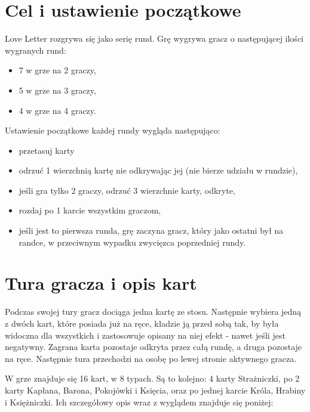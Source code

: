 \section*{Cel i ustawienie początkowe}
\label{sec:celIUstawieniePoczatkowe}
Love Letter rozgrywa się jako serię rund. Grę wygrywa gracz o następującej ilości wygranych rund:
\begin{itemize}
	\item 7 w grze na 2 graczy,
	\item 5 w grze na 3 graczy,
	\item 4 w grze na 4 graczy.
\end{itemize}

Ustawienie początkowe każdej rundy wygląda następująco:
\begin{itemize}
	\item przetasuj karty
	\item odrzuć 1 wierzchnią kartę nie odkrywając jej (nie bierze udziału w rundzie),
	\item jeśli gra tylko 2 graczy, odrzuć 3 wierzchnie karty, odkryte,
	\item rozdaj po 1 karcie wszystkim graczom,
	\item jeśli jest to pierwsza runda, grę zaczyna gracz, który jako ostatni był na randce, w przeciwnym wypadku zwycięzca poprzedniej rundy.
\end{itemize}

\section*{Tura gracza i opis kart}
\label{sec:turaGracza}
Podczas swojej tury gracz dociąga jedna kartę ze stosu. Następnie wybiera jedną z dwóch kart, które posiada już na ręce, kładzie ją przed sobą tak, by była widoczna dla wszystkich i zastosowuje opisany na niej efekt - nawet jeśli jest negatywny. Zagrana karta pozostaje odkryta przez całą rundę, a druga pozostaje na ręce. Następnie tura przechodzi na osobę po lewej stronie aktywnego gracza.

W grze znajduje się 16 kart, w 8 typach. Są to kolejno: 4 karty Strażniczki, po 2 karty Kapłana, Barona, Pokojówki i Księcia, oraz po jednej karcie Króla, Hrabiny i Księżniczki. Ich szczegółowy opis wraz z wyglądem znajduje się poniżej:

